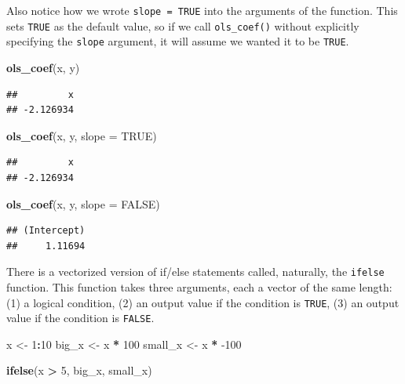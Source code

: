 \documentclass[
  12pt,
  oneside,openany]{book}
\newenvironment{Shaded}{\begin{snugshade}}{\end{snugshade}}
\newcommand{\DataTypeTok}[1]{\textcolor[rgb]{0.13,0.29,0.53}{#1}}
\newcommand{\DecValTok}[1]{\textcolor[rgb]{0.00,0.00,0.81}{#1}}
\newcommand{\KeywordTok}[1]{\textcolor[rgb]{0.13,0.29,0.53}{\textbf{#1}}}
\newcommand{\NormalTok}[1]{#1}
\newcommand{\OperatorTok}[1]{\textcolor[rgb]{0.81,0.36,0.00}{\textbf{#1}}}
\newcommand{\OtherTok}[1]{\textcolor[rgb]{0.56,0.35,0.01}{#1}}
\newcommand{\StringTok}[1]{\textcolor[rgb]{0.31,0.60,0.02}{#1}}
\begin{document}
Also notice how we wrote \texttt{slope\ =\ TRUE} into the arguments of the function.
This sets \texttt{TRUE} as the default value, so if we call \texttt{ols\_coef()} without explicitly specifying the \texttt{slope} argument, it will assume we wanted it to be \texttt{TRUE}.

\begin{Shaded}
\begin{Highlighting}[]
\KeywordTok{ols\_coef}\NormalTok{(x, y)}
\end{Highlighting}
\end{Shaded}

\begin{verbatim}
##         x 
## -2.126934
\end{verbatim}

\begin{Shaded}
\begin{Highlighting}[]
\KeywordTok{ols\_coef}\NormalTok{(x, y, }\DataTypeTok{slope =} \OtherTok{TRUE}\NormalTok{)}
\end{Highlighting}
\end{Shaded}

\begin{verbatim}
##         x 
## -2.126934
\end{verbatim}

\begin{Shaded}
\begin{Highlighting}[]
\KeywordTok{ols\_coef}\NormalTok{(x, y, }\DataTypeTok{slope =} \OtherTok{FALSE}\NormalTok{)}
\end{Highlighting}
\end{Shaded}

\begin{verbatim}
## (Intercept) 
##     1.11694
\end{verbatim}

There is a vectorized version of if/else statements called, naturally, the \texttt{ifelse} function. This function takes three arguments, each a vector of the same length: (1) a logical condition, (2) an output value if the condition is \texttt{TRUE}, (3) an output value if the condition is \texttt{FALSE}.

\begin{Shaded}
\begin{Highlighting}[]
\NormalTok{x <{-}}\StringTok{ }\DecValTok{1}\OperatorTok{:}\DecValTok{10}
\NormalTok{big\_x <{-}}\StringTok{ }\NormalTok{x }\OperatorTok{*}\StringTok{ }\DecValTok{100}
\NormalTok{small\_x <{-}}\StringTok{ }\NormalTok{x }\OperatorTok{*}\StringTok{ }\DecValTok{{-}100}

\KeywordTok{ifelse}\NormalTok{(x }\OperatorTok{>}\StringTok{ }\DecValTok{5}\NormalTok{, big\_x, small\_x)}
\end{Highlighting}
\end{Shaded}
\end{document}
